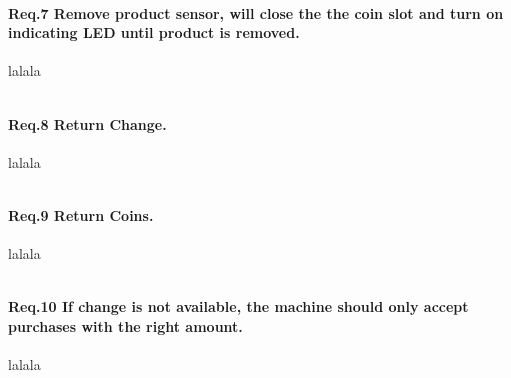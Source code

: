 \paragraph{Req.7 Remove product sensor, will close the the coin slot and turn on indicating LED until product is removed.}
lalala
\begin{lstlisting}[caption={[VHDL]eks. text }]

\end{lstlisting}  


\paragraph{Req.8 Return Change.}
lalala
\begin{lstlisting}[caption={[VHDL]eks. text }]

\end{lstlisting}
 

\paragraph{Req.9 Return Coins.}
lalala
\begin{lstlisting}[caption={[VHDL]eks. text }]

\end{lstlisting}


\paragraph{Req.10 If change is not available, the machine should only accept purchases with the right amount.}
lalala
\begin{lstlisting}[caption={[VHDL]eks. text }]

\end{lstlisting}

